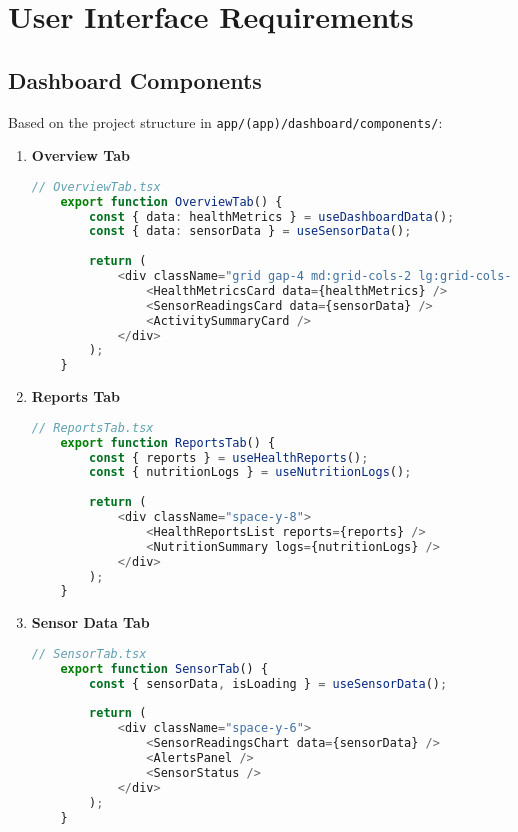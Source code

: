 \section{User Interface Requirements}
\subsection{Dashboard Components}
Based on the project structure in \texttt{app/(app)/dashboard/components/}:

\begin{enumerate}
    \item \textbf{Overview Tab}
    \begin{lstlisting}[language=typescript]
    // OverviewTab.tsx
    export function OverviewTab() {
        const { data: healthMetrics } = useDashboardData();
        const { data: sensorData } = useSensorData();
        
        return (
            <div className="grid gap-4 md:grid-cols-2 lg:grid-cols-3">
                <HealthMetricsCard data={healthMetrics} />
                <SensorReadingsCard data={sensorData} />
                <ActivitySummaryCard />
            </div>
        );
    }
    \end{lstlisting}

    \item \textbf{Reports Tab}
    \begin{lstlisting}[language=typescript]
    // ReportsTab.tsx
    export function ReportsTab() {
        const { reports } = useHealthReports();
        const { nutritionLogs } = useNutritionLogs();
        
        return (
            <div className="space-y-8">
                <HealthReportsList reports={reports} />
                <NutritionSummary logs={nutritionLogs} />
            </div>
        );
    }
    \end{lstlisting}

    \item \textbf{Sensor Data Tab}
    \begin{lstlisting}[language=typescript]
    // SensorTab.tsx
    export function SensorTab() {
        const { sensorData, isLoading } = useSensorData();
        
        return (
            <div className="space-y-6">
                <SensorReadingsChart data={sensorData} />
                <AlertsPanel />
                <SensorStatus />
            </div>
        );
    }
    \end{lstlisting}
\end{enumerate}


